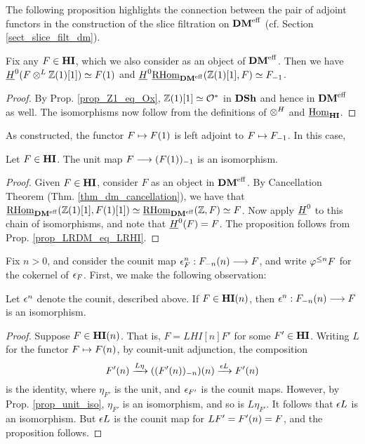 The following proposition highlights the connection between the
pair of adjoint functors in the construction of the slice 
filtration on $\DMeff$ (cf.  Section \ref{sect_slice_filt_dm}).

\begin{prop}\label{prop_LRDM_eq_LRHI}
Fix any $F \in \HI$, which we also consider as an object of 
$\DMeff$. Then we have $\sheaf{H}^0(F \tDM \Z(1)[1]) \simeq 
\LHI{F}$ and $\sheaf{H}^0\ihomDMf(\Z(1)[1], F) \simeq \RHI{F}$.
\end{prop}
\begin{proof}
By Prop. \ref{prop_Z1_eq_Ox}, $\Z(1)[1] \simeq \Ox$ in $\DSh$
and hence in $\DMeff$ as well. The isomorphisms now follow
from the definitions of $\tHI$ and $\ihomHI$.
\end{proof}

As constructed, the functor $F \mapsto \LHI{F}$ is left adjoint to 
$F \mapsto \RHI{F}$. In this case,

\begin{prop}\label{prop_unit_iso}
Let $F \in \HI$. The unit map $F \to \RHI{(\LHI{F})}$ is an
isomorphism.
\end{prop}
\begin{proof}
Given $F \in \HI$, consider $F$ as an object in $\DMeff$. By
Cancellation Theorem (Thm. \ref{thm_dm_cancellation}), we have
that $\ihomDMf(\Z(1)[1], F(1)[1]) \simeq \ihomDMf(\Z, F) 
\simeq F$. Now apply $\sheaf{H}^0$ to this chain of isomorphisms,
and note that $\sheaf{H}^0(F) = F$. The proposition follows from 
Prop. \ref{prop_LRDM_eq_LRHI}.
\end{proof}

Fix $n > 0$, and consider the counit map $\cuHI_F^n: 
\LHI[n]{\RHI[n]{F}} \to F$, and write $\tlHI{n} F$ for the 
cokernel of $\cuHI_F$. First, we make the following observation:

\begin{prop}\label{prop_counit_iso_for_HIn}
Let $\cuHI^n$ denote the counit, described above. If $F \in 
\LHI[n]{\HI}$, then $\cuHI^n : \LHI[n]{\RHI[n]{F}} \to F$ is
an isomorphism.
\end{prop}
\begin{proof}
Suppose $F \in \LHI[n]{\HI}$. That is, $F = LHI[n]{F'}$ for some 
$F' \in \HI$. Writing $L$ for the functor $F \mapsto \LHI[n]F$, 
by counit-unit adjunction, the composition
\[
\LHI[n]{F'} \xrightarrow{L\eta} \LHI[n]{(\RHI[n]{(\LHI[n]{F'})})}
   \xrightarrow{\cuHI L} \LHI[n]{F'}
\]
is the identity, where $\eta_{F'}$ is the unit, and $\cuHI_{F'}$ 
is the counit maps. However, by Prop. \ref{prop_unit_iso}, 
$\eta_{F'}$ is an isomorphism, and so is $L\eta_{F'}$. It follows
that $\cuHI L$ is an isomorphism. But $\cuHI L$ is the counit
map for $LF' = \LHI[n]{F'} = F$, and the proposition follows.
\end{proof}


